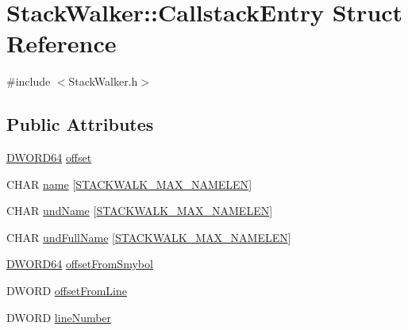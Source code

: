 \hypertarget{struct_stack_walker_1_1_callstack_entry}{\section{Stack\-Walker\-:\-:Callstack\-Entry Struct Reference}
\label{struct_stack_walker_1_1_callstack_entry}
}


{\ttfamily \#include $<$Stack\-Walker.\-h$>$}

\subsection*{Public Attributes}
\begin{DoxyCompactItemize}
\item 
\hyperlink{_stack_walker_8h_a97fb241c597b99bcb965858f53cacac4}{D\-W\-O\-R\-D64} \hyperlink{struct_stack_walker_1_1_callstack_entry_aa6cecf3032065d37a0e2891dc1b90d39}{offset}
\item 
C\-H\-A\-R \hyperlink{struct_stack_walker_1_1_callstack_entry_a645c2afec348019287eb2913cca59b94}{name} \mbox{[}\hyperlink{class_stack_walker_a1744699928d413e6223b3c16df901ccfa9be56eae1b6e1edf9fbcd5df5e7dbb91}{S\-T\-A\-C\-K\-W\-A\-L\-K\-\_\-\-M\-A\-X\-\_\-\-N\-A\-M\-E\-L\-E\-N}\mbox{]}
\item 
C\-H\-A\-R \hyperlink{struct_stack_walker_1_1_callstack_entry_a35b6b8892cfd374d6e8706f8d54461f9}{und\-Name} \mbox{[}\hyperlink{class_stack_walker_a1744699928d413e6223b3c16df901ccfa9be56eae1b6e1edf9fbcd5df5e7dbb91}{S\-T\-A\-C\-K\-W\-A\-L\-K\-\_\-\-M\-A\-X\-\_\-\-N\-A\-M\-E\-L\-E\-N}\mbox{]}
\item 
C\-H\-A\-R \hyperlink{struct_stack_walker_1_1_callstack_entry_abc37f050946b46082c26b10a89f45765}{und\-Full\-Name} \mbox{[}\hyperlink{class_stack_walker_a1744699928d413e6223b3c16df901ccfa9be56eae1b6e1edf9fbcd5df5e7dbb91}{S\-T\-A\-C\-K\-W\-A\-L\-K\-\_\-\-M\-A\-X\-\_\-\-N\-A\-M\-E\-L\-E\-N}\mbox{]}
\item 
\hyperlink{_stack_walker_8h_a97fb241c597b99bcb965858f53cacac4}{D\-W\-O\-R\-D64} \hyperlink{struct_stack_walker_1_1_callstack_entry_aee3a3250c900fca383d490c0157dc4eb}{offset\-From\-Smybol}
\item 
D\-W\-O\-R\-D \hyperlink{struct_stack_walker_1_1_callstack_entry_a1fc963b2492073e1ae10699dfc200cf4}{offset\-From\-Line}
\item 
D\-W\-O\-R\-D \hyperlink{struct_stack_walker_1_1_callstack_entry_acf789192badda2afeeaf03fdeca67727}{line\-Number}
\item 

\end{DoxyCompactItemize}
